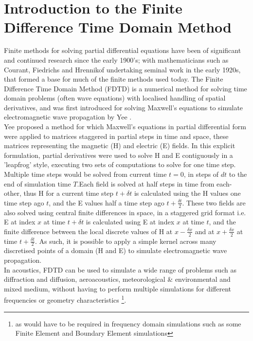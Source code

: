 \section{Introduction to the Finite Difference Time Domain Method}
Finite methods for solving partial differential equations have been of significant and continued research since the early 1900's; with mathematicians such as Courant, Fiedrichs and Hrennikof undertaking seminal work in the early 1920s, that formed a base for much of the finite methods used today. The Finite Difference Time Domain Method (FDTD) is a numerical method for solving time domain problems (often wave equations) with localised handling of spatial derivatives, and was first introduced for solving Maxwell's equations to simulate electromagnetic wave propagation by Yee \cite{Yee1966}.\\
Yee proposed a method for which Maxwell's equations in partial differential form were applied to matrices staggered in partial steps in time and space, these matrices representing the magnetic (H) and electric (E) fields. In this explicit formulation, partial derivatives were used to solve H and E contiguously in a 'leapfrog' style, executing two sets of computations to solve for one time step. Multiple time steps would be solved from current time $t = 0$, in steps of $dt$ to the end of simulation time $T$.Each field is solved at half steps in time from each-other, thus H for a current time step $t + \delta t$ is calculated using the H values one time step ago $t$, and the E values half a time step ago $t + \frac{\delta t}{2} $. These two fields are also solved using central finite differences in space, in a staggered grid format i.e. E at index $x$ at time $t + \delta t$ is calculated using E at index $x$ at time $t$, and the finite difference between the local discrete values of H at $x - \frac{\delta x}{2} $ and at $x + \frac{\delta x}{2} $ at time $t + \frac{\delta t}{2}$. As such, it is possible to apply a simple kernel across many discretised points of a domain (H and E) to simulate electromagnetic wave propagation.\\
In acoustics, FDTD can be used to simulate a wide range of problems such as diffraction and diffusion, aeroacoustics, meteorological \& environmental and mixed medium, without having to perform multiple simulations for different frequencies or geometry characteristics \footnote{as would have to be required in frequency domain simulations such as some Finite Element and Boundary Element simulations}.

